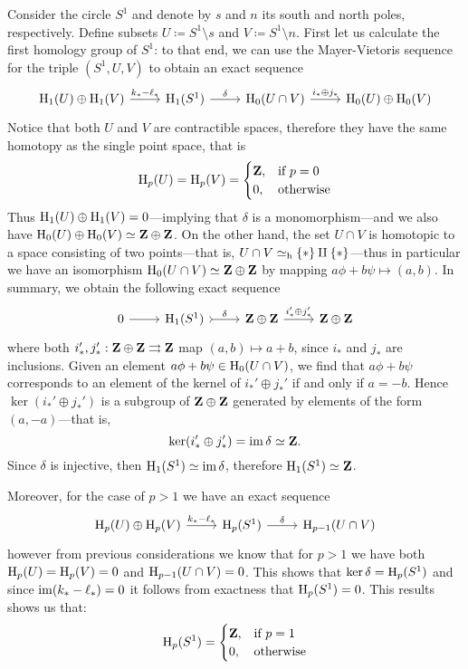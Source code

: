 \begin{example}
\label{exp:homology-of-the-circle}
Consider the circle \(S^1\) and denote by \(s\) and \(n\) its south and north
poles, respectively. Define subsets \(U \coloneq S^1 \setminus s\) and
\(V \coloneq S^1 \setminus n\). First let us calculate the first homology group of
\(S^1\): to that end, we can use the Mayer-Vietoris sequence for the triple
\((S^1, U, V)\) to obtain an exact sequence
\[
\begin{tikzcd}
\Hmlg_1(U) \oplus \Hmlg_1(V) \ar[r, "k_{*} - \ell_{*}"]
&\Hmlg_1(S^1) \ar[r, "\delta"]
&\Hmlg_0(U \cap V) \ar[r, "i_{*} \oplus j_{*}"]
&\Hmlg_0(U) \oplus \Hmlg_0(V)
\end{tikzcd}
\]
Notice that both \(U\) and \(V\) are contractible spaces, therefore they have
the same homotopy as the single point space, that is
\[
\operatorname{H}_p(U) = \operatorname{H}_p(V) =
\begin{cases}
  \mathbf{Z}, &\text{if } p = 0 \\
  0, &\text{otherwise}
\end{cases}
\]
Thus \(\operatorname{H}_1(U) \oplus \operatorname{H}_1(V) = 0\)---implying that \(\delta\) is a monomorphism---and
we also have \(\operatorname{H}_0(U) \oplus \operatorname{H}_0(V) \simeq \mathbf{Z} \oplus \mathbf{Z}\). On the other hand, the
set \(U \cap V\) is homotopic to a space consisting of two points---that is,
\(U \cap V \simeq_{\text{h}} \{*\} \amalg \{*\}\)---thus in particular we have an isomorphism
\(\operatorname{H}_0(U \cap V) \simeq \mathbf{Z} \oplus \mathbf{Z}\) by mapping
\(a \phi + b \psi \mapsto (a, b)\). In summary, we obtain the following exact
sequence
\[
\begin{tikzcd}
0 \ar[r]
&\Hmlg_1(S^1) \ar[r, "\delta", tail]
&\Z \oplus \Z \ar[r, "i_{*}' \oplus j_{*}'"]
&\Z \oplus \Z
\end{tikzcd}
\]
where both \(i_{*}', j_{*}': \mathbf{Z} \oplus \mathbf{Z} \rightrightarrows \mathbf{Z}\) map
\((a, b) \mapsto a + b\), since \(i_{*}\) and \(j_{*}\) are inclusions.  Given an
element \(a \phi + b \psi \in \operatorname{H}_0(U \cap V)\), we find that
\(a \phi + b \psi\) corresponds to an element of the kernel of
\(i_{*}' \oplus j_{*}'\) if and only if \(a = -b\). Hence
\(\ker(i_*' \oplus j_{*}')\) is a subgroup of \(\mathbf{Z} \oplus \mathbf{Z}\) generated by
elements of the form \((a, -a)\)---that is,
\[
\ker(i_{*}' \oplus j_{*}') = \operatorname{im} \delta \simeq \mathbf{Z}.
\]
Since \(\delta\) is injective, then \(\operatorname{H}_1(S^1) \simeq \operatorname{im} \delta\), therefore
\(\operatorname{H}_1(S^1) \simeq \mathbf{Z}\).

Moreover, for the case of \(p > 1\) we have an exact sequence
\[
\begin{tikzcd}
\Hmlg_p(U) \oplus \Hmlg_p(V) \ar[r, "k_{*} - \ell_{*}"]
&\Hmlg_p(S^1) \ar[r, "\delta"]
&\Hmlg_{p-1}(U \cap V)
\end{tikzcd}
\]
however from previous considerations we know that for \(p > 1\) we have both
\(\operatorname{H}_p(U) = \operatorname{H}_p(V) = 0\) and \(\operatorname{H}_{p-1}(U \cap V) = 0\). This shows that
\(\ker \delta = \operatorname{H}_p(S^1)\) and since \(\operatorname{im}(k_{*} - \ell_{*}) = 0\) it follows from
exactness that \(\operatorname{H}_p(S^1) = 0\). This results shows us that:
\[
\operatorname{H}_p(S^1) =
\begin{cases}
  \mathbf{Z}, &\text{if } p = 1 \\
  0, &\text{otherwise}
\end{cases}
\]
\end{example}

